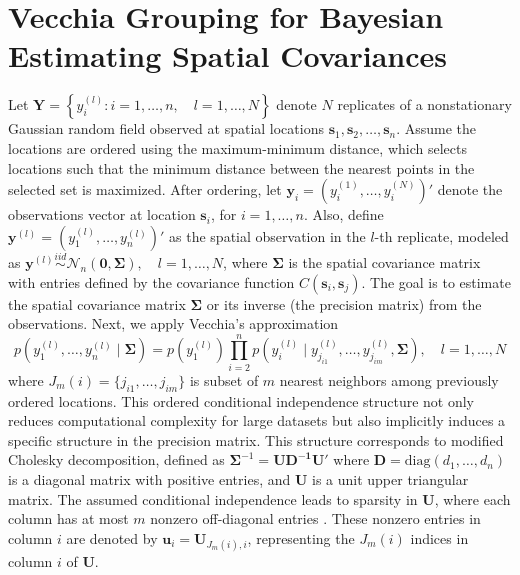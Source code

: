 \documentclass[twoside]{article}
\renewcommand{\/}[1]{\mathbf{\boldsymbol{#1}}}
\begin{document}
\section{  Vecchia  Grouping for Bayesian Estimating  Spatial Covariances}\label{sec2}
Let  
$\mathbf{Y}= \left\lbrace y_{i}^{(l)}: i=1, \dots, n, \quad l= 1, \dots, N\right\rbrace$  
denote $N$ replicates of a nonstationary Gaussian random field observed at spatial locations  
$\mathbf{s}_1, \mathbf{s}_2, \dots,\mathbf{s}_n$.  Assume the locations are ordered using the maximum-minimum distance, which selects locations such that the minimum distance between the nearest points in the selected set is maximized.  After ordering, let $\mathbf{y}_i = \left( y_{i}^{(1)}, \dots,  y_{i}^{(N)}\right)'$ denote the observations vector at location $\mathbf{s}_i$, for $i=1, \dots, n$. Also, define  
$\mathbf{y}^{(l)}=\left(  y_{1}^{(l)}, \dots,  y_{n}^{(l)}\right)'$  
as the spatial observation in the $l$-th replicate, modeled as 
$
\mathbf{y}^{(l)} \stackrel{iid}{\sim} \mathcal{N}_n(\/0, \mathbf{\Sigma}), \quad l= 1, \dots, N$, where $\mathbf{\Sigma}$ is the spatial covariance matrix with entries defined by the covariance function $C(\mathbf{s}_i, \mathbf{s}_j)$. 
The goal is to estimate the spatial covariance matrix $\mathbf{\Sigma}$ or its inverse (the precision matrix) from the observations. 
Next, we apply Vecchia’s approximation
\begin{equation}\label{vecchia eq}
	p(y_1^{(l)}, \ldots, y_n^{(l)} \mid \mathbf{\Sigma}) = p(y_{1}^{(l)}) \prod_{i=2}^{n} p(y_{i}^{(l)} \mid y_{j_{i1}}^{(l)}, \ldots, y_{j_{im}}^{(l)} ,\mathbf{\Sigma}),\quad l=1, \dots , N
\end{equation}
where 
 $J_{m}(i)=\{j_{i1}, \ldots, j_{im}\}$ is subset of $m$ nearest neighbors among previously ordered locations. 
 This ordered conditional independence structure not only reduces computational complexity for large datasets but also implicitly induces a specific structure in the precision matrix. This structure corresponds to  modified Cholesky decomposition, defined as
$	\mathbf{\Sigma}^{-1} = \mathbf{U D^{-1} U'}$ where  $\mathbf{D} = \text{diag}(d_1, \dots, d_n)$ is a diagonal matrix with positive entries, and $\mathbf{U}$ is a unit upper triangular matrix. The assumed conditional independence leads to sparsity in $\mathbf{U}$, where each column has at most $m$ nonzero off-diagonal entries \citep{kidd2022bayesian}. These nonzero entries in column $i$ are denoted by  
$\mathbf{u}_i = \mathbf{U}_{J_m(i), i}$,  
representing the $J_m(i)$ indices in column $i$ of $\mathbf{U}$.
\end{document}

